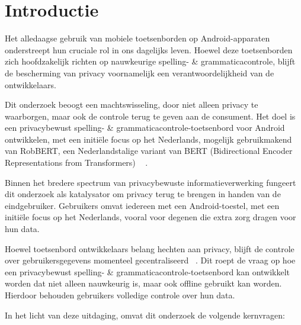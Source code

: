 
\section{Introductie}%
\label{sec:introductie}

Het alledaagse gebruik van mobiele toetsenborden op Android-apparaten onderstreept hun cruciale rol in ons dagelijks leven. Hoewel deze toetsenborden zich hoofdzakelijk richten op nauwkeurige spelling- \& grammatica\-controle, blijft de bescherming van privacy voornamelijk een verantwoordelijkheid van de ontwikkelaars.

Dit onderzoek beoogt een machtswisseling, door niet alleen privacy te waarborgen, maar ook de controle terug te geven aan de consument. Het doel is een privacybewust spelling- \& grammatica\-controle-toetsenbord voor Android ontwikkelen, met een initiële focus op het Nederlands, mogelijk gebruikmakend van RobBERT, een Nederlandstalige variant van BERT (Bidirectional Encoder Representations from Transformers) ~\autocite{Delobelle2020} .

Binnen het bredere spectrum van privacybewuste informatieverwerking fungeert dit onderzoek als katalysator om privacy terug te brengen in handen van de eindgebruiker. Gebruikers omvat iedereen met een Android-toestel, met een initiële focus op het Nederlands, vooral voor degenen die extra zorg dragen voor hun data.

Hoewel toetsenbord ontwikkelaars belang he\-ch\-ten aan privacy, blijft de controle over gebruikersgegevens momenteel gecentraliseerd ~\autocite{GrammarlyInc2023, SECL2023}. Dit roept de vraag op hoe een privacybewust spel\-ling- \& grammatica\-controle-toetsenbord kan ontwikkelt worden dat niet alleen nauwkeurig is, maar ook offline gebruikt kan worden. Hierdoor behouden gebruikers volledige controle over hun data.

In het licht van deze uitdaging, omvat dit onderzoek de volgende kernvragen:

